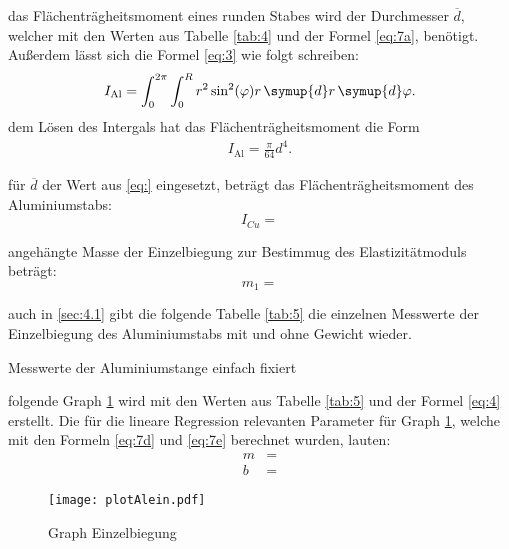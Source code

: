 \justifying das Flächenträgheitsmoment eines runden Stabes wird der Durchmesser $\overline{d}$, welcher mit den Werten aus Tabelle
\ref{tab:4} und der Formel \eqref{eq:7a}, benötigt. Außerdem lässt sich die Formel \eqref{eq:3} 
wie folgt schreiben:
\begin{align}
    I_{\text{Al}}=\int_{0}^{2\pi} \int_{0}^{R} r^2 \sin^2(\varphi) r \, \symup{d}r \, \symup{d}\varphi \label{eq:}.
\end{align}
\justifying  dem Lösen des Intergals hat das Flächenträgheitsmoment die Form
\begin{align}
     I_{\text{Al}}=\frac{\pi}{64} d^4. \label{eq:}
\end{align}

\justifying für $\overline{d}$ der Wert aus \eqref{eq:} eingesetzt, beträgt das Flächenträgheitsmoment des Aluminiumstabs:
\begin{equation}
I_{Cu} = \text{} \label{eq:}
\end{equation}

\justifying angehängte Masse der Einzelbiegung zur Bestimmug des Elastizitätmoduls beträgt:
\begin{equation}
    m_1 = \text{} \label{eq:}
\end{equation}

\justifying auch in \ref{sec:4.1} gibt die folgende Tabelle \ref{tab:5} die einzelnen Messwerte der Einzelbiegung des Aluminiumstabs mit und ohne Gewicht
wieder.
\begin{table}[H]
    \centering
    
    \caption{Messwerte der Aluminiumstange einfach fixiert}
    \label{tab:5}
\end{table}

\justifying  folgende Graph \ref{fig:3} wird mit den Werten aus Tabelle \ref{tab:5} und der Formel \eqref{eq:4} erstellt. 
Die für die lineare Regression relevanten Parameter für Graph \ref{fig:3}, welche mit den Formeln \eqref{eq:7d} und \eqref{eq:7e} berechnet wurden,
lauten:
\begin{subequations}\label{eq:}
\begin{align}
    m &= \text{} \label{eq:a}\\
    b &= \text{} \label{eq:b}
\end{align}
\end{subequations}

\begin{figure}[H]
    \centering
    \texttt{[image: plotAlein.pdf]}
    \caption{Graph Einzelbiegung}
    \label{fig:3}
\end{figure}

